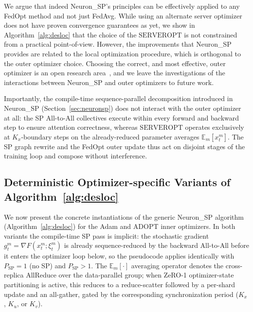 \documentclass{article}
\begin{document}
We argue that indeed Neuron\_SP's principles can be effectively applied to any FedOpt method and
not just FedAvg. While using an alternate server optimizer does not have proven convergence
guarantees as yet, we show in Algorithm~\ref{alg:desloc} that the choice of the $\mathrm{SERVEROPT}$ is not constrained
from a practical point-of-view. However, the improvements that Neuron\_SP provides are related to
the local optimization procedure, which is orthogonal to the outer optimizer choice.
Choosing the correct, and most effective, outer optimizer is an open research area~\citep{khaled2025tuning},
and we leave the investigations of the interactions between Neuron\_SP and outer optimizers to future work.

Importantly, the compile-time sequence-parallel decomposition introduced in Neuron\_SP
(Section~\ref{sec:neuronsp}) does not interact with the outer optimizer at all: the SP
All-to-All collectives execute within every forward and backward step to ensure attention
correctness, whereas $\mathrm{SERVEROPT}$ operates exclusively at $K_x$-boundary steps on the
already-reduced parameter averages $\mathbb{E}_m[x^m_t]$.
The SP graph rewrite and the FedOpt outer update thus act on disjoint stages of the training
loop and compose without interference.

\subsection{Deterministic Optimizer-specific Variants of Algorithm~\ref{alg:desloc}}
\label{sec:algorithm_variants}

We now present the concrete instantiations of the generic Neuron\_SP algorithm
(Algorithm~\ref{alg:desloc}) for the Adam and ADOPT inner optimizers.
In both variants the compile-time SP pass is implicit: the stochastic gradient
$g^m_t = \nabla F(x^m_t; \xi^m_t)$ is already sequence-reduced by the backward All-to-All
before it enters the optimizer loop below, so the pseudocode applies identically with
$P_{\text{SP}} = 1$ (no SP) and $P_{\text{SP}} > 1$.
The $\mathbb{E}_m[\cdot]$ averaging operator denotes the cross-replica AllReduce over the
data-parallel group; when ZeRO-1 optimizer-state partitioning is active, this reduces to a
reduce-scatter followed by a per-shard update and an all-gather, gated by the corresponding
synchronization period ($K_x$, $K_u$, or $K_v$).
\end{document}

